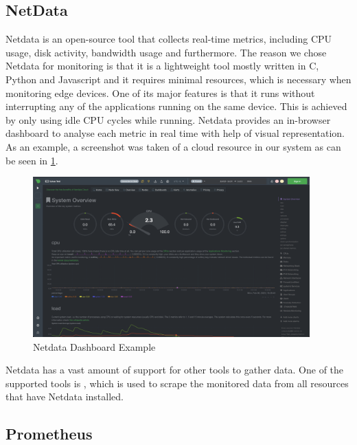   \subsection{NetData}
  \label{sec:netdata-evaluation-setup}

    Netdata is an open-source tool that collects real-time metrics, including CPU usage, disk activity, bandwidth usage and furthermore.
    The reason we chose Netdata for monitoring is that it is a lightweight tool mostly written in C, Python and Javascript and it requires minimal resources, which is necessary when monitoring edge devices.
    One of its major features is that it runs without interrupting any of the applications running on the same device. This is achieved by only using idle CPU cycles while running.
    Netdata provides an in-browser dashboard to analyse each metric in real time with help of visual representation. As an example, a screenshot was taken of a cloud resource in our system as can be seen in \ref{fig:netdata-dashboard}.
    \begin{figure}[h!]
        \centering
        \includegraphics[width=0.95\textwidth]{figures/netdata.png}
        \caption{Netdata Dashboard Example}
        \label{fig:netdata-dashboard}
    \end{figure}
    Netdata has a vast amount of support for other tools to gather data. 
    One of the supported tools is , which is used to scrape the monitored data from all resources that have Netdata installed.

  \subsection{Prometheus}
  \label{sec:prometheus-evaluation-setup}
  
